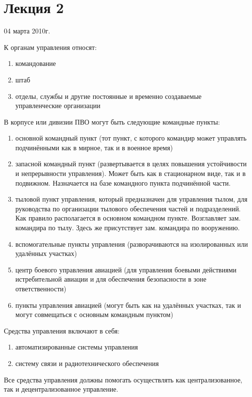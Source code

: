 \documentclass[a4paper,12pt]{article}
\begin{document}
	\section{Лекция 2}
	\centerline{04 марта 2010г.}
	К органам управления относят:
	\begin{enumerate}
		\item командование
		\item штаб
		\item отделы, службы и другие постоянные и временно создаваемые управленческие 
		организации
	\end{enumerate}
	В корпусе или дивизии ПВО могут быть следующие командные пункты:
	\begin{enumerate}
		\item основной командный пункт (тот пункт, с которого командир может управлять 
		подчинёнными как в мирное, так и в военное время)
		\item запасной командный пункт (развертывается в целях повышения устойчивости и 
		непрерывности управления). Может быть как в стационарном виде, так и в подвижном. 
		Назначается на базе командного пункта подчинённой части. 
		\item тыловой пункт управления, который предназначен для управления тылом, для 
		руководства по организации тылового обеспечения частей и подразделений. Как правило 
		располагается в основном командном пункте. Возглавляет зам. командира по тылу. Здесь 
		же присутствует зам. командира по вооружению.
		\item вспомогательные пункты управления (разворачиваются на изолированных или удалённых
		участках)
		\item центр боевого управления авиацией (для управления боевыми действиями 
		истребительной авиации и для обеспечения безопасности в зоне ответственности)
		\item пункты управления авиацией (могут быть как на удалённых участках, так и могут 
		совмещаться с основным командным пунктом)
	\end{enumerate}
	Средства управления включают в себя:
	\begin{enumerate}
		\item автоматизированные системы управления
		\item систему связи и радиотехнического обеспечения
	\end{enumerate}
	Все средства управления должны помогать осуществлять как централизованное, так и
децентрализованное управление.
\end{document}
